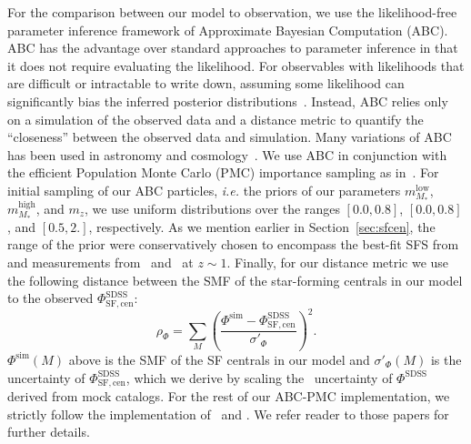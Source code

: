 \documentclass[12pt, letterpaper, preprint, tighten]{aastex62}
\newcommand{\beq}{\begin{equation}}
\newcommand{\eeq}{\end{equation}}
\begin{document}
For the comparison between our model to observation, we use the likelihood-free parameter 
inference framework of Approximate Bayesian Computation (ABC). ABC has the 
advantage over standard approaches to parameter inference in that it does not 
require evaluating the likelihood. For observables with likelihoods that are 
difficult or intractable to write down, assuming some likelihood can significantly 
bias the inferred posterior distributions~\citep[\emph{e.g.}][]{hahn2018}. Instead, 
ABC relies only on a simulation of the observed data and a distance metric to 
quantify the ``closeness'' between the observed data and simulation. Many variations 
of ABC has been used in astronomy and 
cosmology~\citep[\emph{e.g.}][]{cameron2012,weyant2013,ishida2015,alsing2018}. 
We use ABC in conjunction with the efficient Population Monte Carlo (PMC)
importance sampling as in~\citep{hahn2017b, hahn2017a}. For initial sampling 
of our ABC particles, \emph{i.e.} the priors of our parameters 
$m^\mathrm{low}_{M_*}$, $m^\mathrm{high}_{M_*}$, and $m_z$, we use uniform 
distributions over the ranges $[0.0, 0.8]$, $[0.0, 0.8]$, and 
$[0.5, 2.]$, respectively. As we mention earlier in Section~\ref{sec:sfcen}, 
the range of the prior were conservatively chosen to encompass the best-fit 
SFS from~\cite{speagle2014} 
and measurements from~\cite{moustakas2013} and~\cite{lee2015} at $z \sim 1$. 
Finally, for our distance metric we use the following distance between 
the SMF of the star-forming centrals in our model to the observed 
$\Phi^\mathrm{SDSS}_\mathrm{SF,cen}$: 
\beq
\rho_\Phi = \sum\limits_{M} \left( \frac{\Phi^\mathrm{sim} - \Phi^\mathrm{SDSS}_\mathrm{SF,cen}}{\sigma'_\Phi}\right)^2.
\eeq
$\Phi^\mathrm{sim}(M)$ above is the SMF of the SF centrals in our model 
and $\sigma'_\Phi(M)$ is the uncertainty of $\Phi^\mathrm{SDSS}_\mathrm{SF,cen}$, 
which we derive by scaling the~\cite{li2009} uncertainty of $\Phi^\mathrm{SDSS}$ 
derived from mock catalogs. %
For the rest of our ABC-PMC implementation, we strictly follow the implementation 
of~\cite{hahn2017a} and \cite{hahn2017b}. We refer reader to those papers for 
further details.
\end{document}
